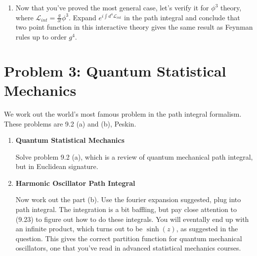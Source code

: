 \documentclass[11pt]{article}
\begin{document}
\begin{enumerate}
\begin{problem}{\points{-}}
\begin{enumerate}
			\noindent
			[Despite its formidable appearance, it's a trivial question. Don't be afraid and start by divding full Lagrangian into $\mathscr{L} = \mathscr{L}_{free} + \mathscr{L}_{int}$, then plug it into path integral and use the relation between path-integral and n-point function in "Free Theories".]
			
			\item  Now that you've proved the most general case, let's verify it for $\phi^3$ theory, where $\mathscr{L}_{int} = \frac{g}{3!} \phi^3$. Expand $e^{i\int d^4 \mathscr{L}_{int}}$ in the path integral and conclude that two point function in this interactive theory gives the same result as Feynman rules up to order $g^4$.
		\end{enumerate}
	\end{problem}





\end{enumerate}


\newpage
\section*{Problem 3: Quantum Statistical Mechanics}
\begin{problem}
	We work out the world's most famous problem in the path integral formalism. These problems are 9.2 (a) and (b), Peskin.
\end{problem}	

\begin{enumerate}
	\item
	\begin{problem}{}
		\textbf{Quantum Statistical Mechanics} 
		
		\noindent
		Solve problem 9.2 (a), which is a review of quantum mechanical path integral, but in Euclidean signature.
	\end{problem}
	\item
	\begin{problem}{}
		\textbf{Harmonic Oscillator Path Integral}
		
		\noindent
	Now work out the part (b). Use the fourier expansion suggested, plug into path integral. The integration is a bit baffling, but pay close attention to (9.23) to figure out how to do these integrals. You will eventally end up with an infinite product, which turns out to be $\sinh(z)$, as suggested in the question. This gives the correct partition function for quantum mechanical oscillators, one that you've read in advanced statistical mechanics courses.
	\end{problem}
	
	
	
	
	
\end{enumerate}
\end{document}
